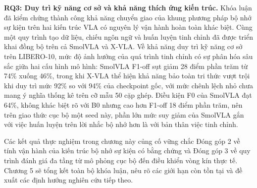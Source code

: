 \textbf{RQ3: Duy trì kỹ năng cơ sở và khả năng thích ứng kiến trúc.} Khóa luận đã kiểm chứng thành công khả năng chuyển giao của khung phương pháp bộ nhớ sự kiện trên hai kiến trúc VLA có nguyên lý vận hành hoàn toàn khác biệt. Cùng một quy trình tạo dữ liệu, chiếu ngôn ngữ và huấn luyện tinh chỉnh đã được triển khai đồng bộ trên cả SmolVLA và X-VLA. Về khả năng duy trì kỹ năng cơ sở trên LIBERO-10, mức độ ảnh hưởng của quá trình tinh chỉnh có sự phân hóa sâu sắc giữa hai cấu hình mô hình: SmolVLA F1-off sụt giảm 28 điểm phần trăm từ 74\% xuống 46\%, trong khi X-VLA thể hiện khả năng bảo toàn tri thức vượt trội khi duy trì mức 92\% so với 94\% của checkpoint gốc, với mức chênh lệch nhỏ chưa mang ý nghĩa thống kê trên cỡ mẫu 50 cặp ghép. Điều kiện F0 của SmolVLA đạt 64\%, không khác biệt rõ với B0 nhưng cao hơn F1-off 18 điểm phần trăm, nên trên giao thức cục bộ một seed này, phần lớn mức suy giảm của SmolVLA gắn với việc huấn luyện trên lời nhắc bộ nhớ hơn là với bản thân việc tinh chỉnh.

Các kết quả thực nghiệm trong chương này củng cố vững chắc Đóng góp 2 về tính vận hành của kiến trúc bộ nhớ sự kiện có bằng chứng và Đóng góp 3 về quy trình đánh giá đa tầng từ mô phỏng cục bộ đến điều khiển vòng kín thực tế. Chương 5 sẽ tổng kết toàn bộ khóa luận, nêu rõ các giới hạn còn tồn tại và đề xuất các định hướng nghiên cứu tiếp theo.
